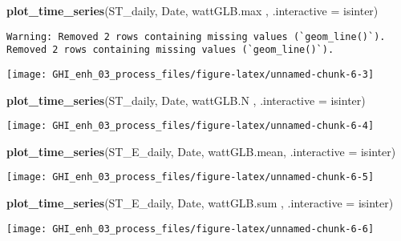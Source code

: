 \documentclass[
  10pt,
  a4paper,oneside]{article}
\newenvironment{Shaded}{\begin{snugshade}}{\end{snugshade}}
\newcommand{\AttributeTok}[1]{\textcolor[rgb]{0.13,0.29,0.53}{#1}}
\newcommand{\FunctionTok}[1]{\textcolor[rgb]{0.13,0.29,0.53}{\textbf{#1}}}
\newcommand{\NormalTok}[1]{#1}
\begin{document}
\begin{Shaded}
\begin{Highlighting}[]
\FunctionTok{plot\_time\_series}\NormalTok{(ST\_daily, Date, wattGLB.max , }\AttributeTok{.interactive =}\NormalTok{ isinter)}
\end{Highlighting}
\end{Shaded}

\begin{verbatim}
Warning: Removed 2 rows containing missing values (`geom_line()`).
Removed 2 rows containing missing values (`geom_line()`).
\end{verbatim}

\begin{center}\texttt{[image: GHI\_enh\_03\_process\_files/figure-latex/unnamed-chunk-6-3]} \end{center}

\begin{Shaded}
\begin{Highlighting}[]
\FunctionTok{plot\_time\_series}\NormalTok{(ST\_daily, Date, wattGLB.N   , }\AttributeTok{.interactive =}\NormalTok{ isinter)}
\end{Highlighting}
\end{Shaded}

\begin{center}\texttt{[image: GHI\_enh\_03\_process\_files/figure-latex/unnamed-chunk-6-4]} \end{center}

\begin{Shaded}
\begin{Highlighting}[]
\FunctionTok{plot\_time\_series}\NormalTok{(ST\_E\_daily, Date, wattGLB.mean, }\AttributeTok{.interactive =}\NormalTok{ isinter)}
\end{Highlighting}
\end{Shaded}

\begin{center}\texttt{[image: GHI\_enh\_03\_process\_files/figure-latex/unnamed-chunk-6-5]} \end{center}

\begin{Shaded}
\begin{Highlighting}[]
\FunctionTok{plot\_time\_series}\NormalTok{(ST\_E\_daily, Date, wattGLB.sum , }\AttributeTok{.interactive =}\NormalTok{ isinter)}
\end{Highlighting}
\end{Shaded}

\begin{center}\texttt{[image: GHI\_enh\_03\_process\_files/figure-latex/unnamed-chunk-6-6]} \end{center}
\end{document}
